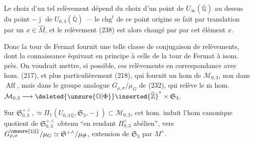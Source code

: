 Le choix d'un tel relèvement dépend du choix d'un point de
$U_\infty(\overline{\mathbb Q})$ au dessus du point $-\bar{\jmath}$
de $U_{0,3}(\overline{\mathbb Q})$ --- le $\mathrm{chg}^{t}$ de ce
point origine se fait par translation par un $x\in\widehat M$,
et le relèvement (238) est alors changé par 
par cet élément $x$.

Donc la tour de Fermat fournit une telle classe de conjugaison
de relèvements, dont la connaissance équivaut en principe
à celle de la tour de Fermat à isom. près. On voudrait mettre,
si possible, ces relèvements en correspondance avec
 hom. (217), et plus particulièrement
 (218), qui fournit un hom
 de $\mathcal M_{0,3}$, non dans
 $\operatorname{Aff}$, mais dans
le groupe analogue $G_{\rho,\sigma}/\mu_G$ de (232), qui relève
le $\overline{\mathrm m}$ hom.
$\mathcal M_{0,3}\longrightarrow
\deleted{\unsure{\mathbb O|\Phi}}\inserted{\widehat{\mathbb Z}}^{*}\times\mathfrak S_3$.



Sur $\mathfrak S_{0,3}^{+\wedge},\simeq
\Pi_1(U_{0,3\,\overline{\mathbb Q}},\mathfrak S_3,-\bar{\jmath})
\subset\mathcal M_{0,3}$,
cet hom. induit l'hom canonique
 quotient de $\mathfrak S_{0,3}^{+\wedge}$
obtenu ``en rendant $\Pi_{0,3}^\wedge$ abélien'',
vers $G_{\rho,\sigma}^{\unsure{\natural|\sharp}}/\mu_G
\simeq\mathfrak S^{+\wedge}/\mu_{\mathfrak S}$, extension de
$\mathfrak S_3$
par $M^\wedge$.

